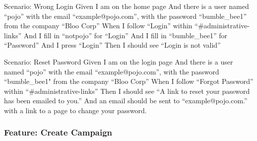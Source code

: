 \documentclass[12pt]{article}
\begin{document}
\begin{hangparas}{0.25in}{1}
Scenario: Wrong Login 
  Given I am on the home page 
  And there is a user named ``pojo'' with the email ``example@pojo.com'', with the password ``bumble\_bee1'' from the company ``Bloo Corp'' 
  When I follow ``Login'' within ``\#administrative-links'' 
  And I fill in ``notpojo'' for ``Login'' 
  And I fill in ``bumble\_bee1'' for ``Password'' 
  And I press ``Login'' 
  Then I should see ``Login is not valid'' 

Scenario: Reset Password 
  Given I am on the login page 
  And there is a user named ``pojo'' with the email ``example@pojo.com'', with the password ``bumble\_bee1" from the company ``Bloo Corp'' 
  When I follow ``Forgot Password'' within ``\#administrative-links'' 
  Then I should see ``A link to reset your password has been emailed to you.'' 
  And an email should be sent to ``example@pojo.com.'' with a link to a page to change your password. 
\end{hangparas}

\subsubsection{Feature: Create Campaign}
\end{document}
